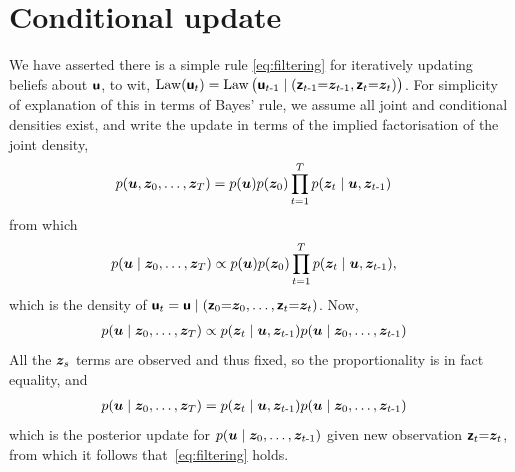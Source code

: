 \section{Conditional update}\label{app:conditioning-dag}

We have asserted there is a simple rule \eqref{eq:filtering} for iteratively updating beliefs about \(\boldsymbol{\mathsf{u}}\), to wit, 
\(\operatorname{Law}(\boldsymbol{\mathsf{u}}_{t}) = \operatorname{Law}\big(\boldsymbol{\mathsf{u}}_{t{\operatorname{-}}1} \mid (\boldsymbol{\mathsf{z}}_{t{\operatorname{-}}1}{=}\boldsymbol{z}_{t{\operatorname{-}}1}, \boldsymbol{\mathsf{z}}_{t}{=}\boldsymbol{z}_{t})\big)\).
For simplicity of explanation of this in terms of Bayes' rule, we assume all joint and conditional densities exist, and write the update in terms of the implied factorisation of the joint density,
\begin{align*}
    p(\boldsymbol{u}, \boldsymbol{z}_{0},\dots,\boldsymbol{z}_{T})
    &=p(\boldsymbol{u})p(\boldsymbol{z}_{0})\prod_{t=1}^{T}p(\boldsymbol{z}_{t}\mid \boldsymbol{u}, \boldsymbol{z}_{t{\operatorname{-}}1})
\end{align*}
from which
\begin{align*}
    p(\boldsymbol{u}\mid \boldsymbol{z}_{0},\dots,\boldsymbol{z}_{T})
    &\propto p(\boldsymbol{u})p(\boldsymbol{z}_{0})\prod_{t=1}^{T}p(\boldsymbol{z}_{t}\mid \boldsymbol{u}, \boldsymbol{z}_{t{\operatorname{-}}1}),
\end{align*}
which is the density of \(\boldsymbol{\mathsf{u}}_{t}=\boldsymbol{\mathsf{u}}\mid (\boldsymbol{\mathsf{z}}_{0}{=}\boldsymbol{z}_{0},\dots,\boldsymbol{\mathsf{z}}_{t}{=}\boldsymbol{z}_{t})\). Now,
\begin{align*}
    p(\boldsymbol{u}\mid \boldsymbol{z}_{0},\dots,\boldsymbol{z}_{T})
    &\propto p(\boldsymbol{z}_{t}\mid \boldsymbol{u}, \boldsymbol{z}_{t{\operatorname{-}}1})p(\boldsymbol{u} \mid \boldsymbol{z}_{0},\dots, \boldsymbol{z}_{t{\operatorname{-}}1})
\end{align*}
All the \(\boldsymbol{z}_{s}\) terms are observed and thus fixed, so the proportionality is in fact equality, and
\begin{align*}
    p(\boldsymbol{u}\mid \boldsymbol{z}_{0},\dots,\boldsymbol{z}_{T})
    &= p(\boldsymbol{z}_{t}\mid \boldsymbol{u}, \boldsymbol{z}_{t{\operatorname{-}}1})p(\boldsymbol{u} \mid \boldsymbol{z}_{0},\dots, \boldsymbol{z}_{t{\operatorname{-}}1})
\end{align*}
which is the posterior update for \(p(\boldsymbol{u} \mid \boldsymbol{z}_{0},\dots, \boldsymbol{z}_{t{\operatorname{-}}1})\) given new observation \(\boldsymbol{\mathsf{z}}_{t}{=}\boldsymbol{z}_{t}\),
from which it follows that~\eqref{eq:filtering} holds.


